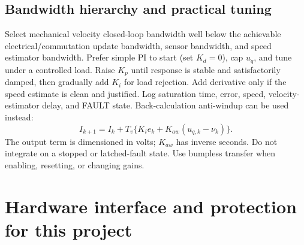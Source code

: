 \documentclass[10pt,letterpaper]{article}
\begin{document}
\subsection{Bandwidth hierarchy and practical tuning}
Select mechanical velocity closed-loop bandwidth well below the achievable electrical/commutation update bandwidth, sensor bandwidth, and speed estimator bandwidth. Prefer simple PI to start (set $K_d=0$), cap $u_q$, and tune under a controlled load. Raise $K_p$ until response is stable and satisfactorily damped, then gradually add $K_i$ for load rejection. Add derivative only if the speed estimate is clean and justified. Log saturation time, error, speed, velocity-estimator delay, and FAULT state. Back-calculation anti-windup can be used instead:
\begin{equation}
I_{k+1}=I_k+T_v\{K_ie_k+K_{aw}(u_{q,k}-\nu_k)\}.
\end{equation}
The output term is dimensioned in volts; $K_{aw}$ has inverse seconds. Do not integrate on a stopped or latched-fault state. Use bumpless transfer when enabling, resetting, or changing gains.

\section{Hardware interface and protection for this project}
\end{document}
